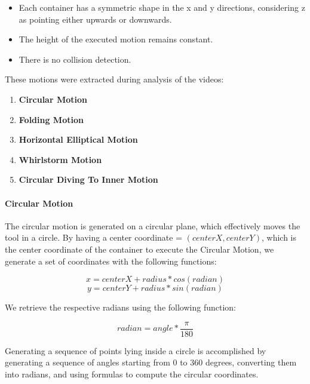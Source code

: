 \begin{itemize}
  \item Each container has a symmetric shape in the x and y directions, considering z as pointing either upwards or downwards.
  \item The height of the executed motion remains constant.
  \item There is no collision detection.
\end{itemize}

These motions were extracted during analysis of the videos:

\begin{enumerate}
  \item \textbf{Circular Motion}
  \item \textbf{Folding Motion}
  \item \textbf{Horizontal Elliptical Motion}
  \item \textbf{Whirlstorm Motion}
  \item \textbf{Circular Diving To Inner Motion}
\end{enumerate}

\paragraph{Circular Motion}
The circular motion is generated on a circular plane, which effectively moves the tool in a circle. 
By having a center coordinate = $(centerX, centerY)$, which is the center coordinate of 
the container to execute the Circular Motion, we generate a set of coordinates
with the following functions: 

\[x = centerX + radius * cos(radian)\]
\[y = centerY + radius * sin(radian)\]

We retrieve the respective radians using the following function:

\[radian = angle * \frac{\pi}{180}\]

Generating a sequence of points lying inside a circle is accomplished by generating a sequence of angles starting from 0 to 360 degrees, 
converting them into radians, and using formulas to compute the circular coordinates.

